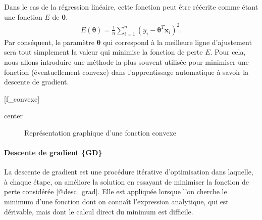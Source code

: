\documentclass[letterpaper,11pt,english]{sphinxmanual}
\begin{document}
\begin{itemize}
\sphinxAtStartPar
Dans le cas de la régression linéaire, cette fonction peut être
réécrite comme étant une fonction \(E\) de
\(\boldsymbol{\theta}\).
\begin{equation}\label{equation:chapter3:chapter3:12}
\begin{split}E\left(\boldsymbol{\theta}\right)  = \frac{1}{n}\sum_{i=1}^{n}(y_i - \boldsymbol{\theta}^{T} \mathbf{x}_i)^2.\end{split}
\end{equation}
\sphinxAtStartPar
Par conséquent, le paramètre \(\boldsymbol{\theta}\) qui
correspond à la meilleure ligne d’ajustement sera tout simplement la
valeur qui minimise la fonction de perte \(E\). Pour cela, nous
allons introduire une méthode la plus souvent utilisée pour minimiser
une fonction (éventuellement convexe) dans l’apprentissage
automatique à savoir la descente de gradient.

\sphinxAtStartPar
{[}f\_convexe{]}

\begin{sphinxuseclass}{center}
\begin{figure}[H]
\centering
\capstart

\noindent{}
\caption{Représentation graphique d’une fonction convexe}\label{\detokenize{chapter3:id9}}\end{figure}

\end{sphinxuseclass}
\end{itemize}


\paragraph{Descente de gradient \{GD\}}
\label{\detokenize{chapter3:descente-de-gradient-gd}}
\sphinxAtStartPar
La descente de gradient est une procédure itérative d’optimisation dans
laquelle, à chaque étape, on améliore la solution en essayant de
minimiser la fonction de perte considérée {[}@desc\_grad{]}. Elle est
appliquée lorsque l’on cherche le minimum d’une fonction dont on connaît
l’expression analytique, qui est dérivable, mais dont le calcul direct
du minimum est difficile.
\end{document}
